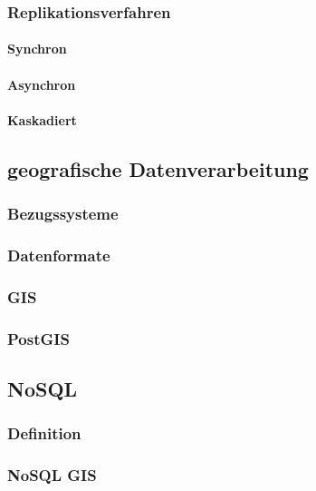 \subsubsection{Replikationsverfahren}

\paragraph{Synchron}

\paragraph{Asynchron}

\paragraph{Kaskadiert}


\subsection{geografische Datenverarbeitung}

\subsubsection{Bezugssysteme}

\subsubsection{Datenformate}

\subsubsection{GIS}

\subsubsection{PostGIS}



\subsection{NoSQL}

\subsubsection{Definition}

\subsubsection{NoSQL GIS}

